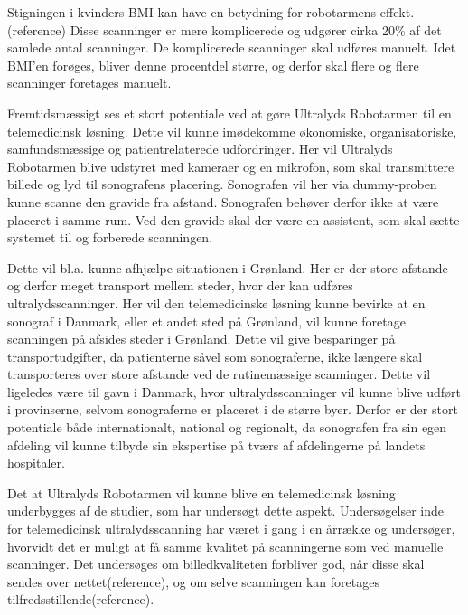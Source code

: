 Stigningen i kvinders BMI kan have en betydning for robotarmens effekt. (reference) Disse scanninger er mere komplicerede og udgører cirka 20\% af det samlede antal scanninger. De komplicerede scanninger skal udføres manuelt. Idet BMI’en forøges, bliver denne procentdel større, og derfor skal flere og flere scanninger foretages manuelt. 

Fremtidsmæssigt ses et stort potentiale ved at gøre Ultralyds Robotarmen til en telemedicinsk løsning. Dette vil kunne imødekomme økonomiske, organisatoriske, samfundsmæssige og patientrelaterede
udfordringer. Her vil Ultralyds Robotarmen blive udstyret med kameraer og en mikrofon, som skal transmittere billede og lyd til sonografens placering. Sonografen vil her via dummy-proben kunne scanne den gravide fra afstand. Sonografen behøver derfor ikke at være placeret i samme rum. Ved den gravide skal der være en assistent, som skal sætte systemet til og forberede scanningen.
 
Dette vil bl.a. kunne afhjælpe situationen i Grønland. Her er der store afstande og derfor meget transport mellem steder, hvor der kan udføres ultralydsscanninger. Her vil den telemedicinske løsning kunne bevirke at en sonograf i Danmark, eller et andet sted på Grønland, vil kunne foretage scanningen på afsides steder i Grønland. Dette vil give besparinger på transportudgifter, da patienterne såvel som sonograferne, ikke længere skal transporteres over store afstande ved de rutinemæssige scanninger. 
Dette vil ligeledes være til gavn i Danmark, hvor ultralydsscanninger vil kunne blive udført i provinserne, selvom sonograferne er placeret i de større byer.
Derfor er der stort potentiale både internationalt, national og regionalt, da sonografen fra sin egen afdeling vil kunne tilbyde sin ekspertise på tværs af afdelingerne på landets hospitaler. 

Det at Ultralyds Robotarmen vil kunne blive en telemedicinsk løsning underbygges af de studier, som har undersøgt dette aspekt. Undersøgelser inde for telemedicinsk ultralydsscanning har været i gang i en årrække og undersøger, hvorvidt det er muligt at få samme kvalitet på scanningerne som ved manuelle scanninger. Det undersøges om billedkvaliteten forbliver god, når disse skal sendes over nettet(reference), og om selve scanningen kan foretages tilfredsstillende(reference). 


